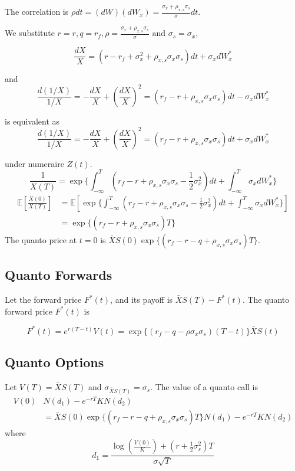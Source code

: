 \documentclass[a4]{article}
\begin{document}
The correlation is $\rho dt=(dW)(dW_{x})=\frac{\sigma_{x}+\rho_{x,s}\sigma_{s}}{\sigma}dt$.\par\bigbreak
\noindent We substitute $r=r,q=r_{f},\rho=\frac{\sigma_{x}+\rho_{x,s}\sigma_{s}}{\sigma}\text{ and } \sigma_{s}=\sigma_{x}$,\par 
$$
\frac{dX}{X}=(r-r_{f}+\sigma_{x}^{2}+\rho_{x,s}\sigma_{x}\sigma_{s})dt + \sigma_{x}dW_{x}^{*}
$$\par 
and $$
\frac{d(1/X)}{1/X}=-\frac{dX}{X} + (\frac{dX}{X})^{2}=(r_{f}-r + \rho_{x,s}\sigma_{x}\sigma_{s})dt-\sigma_{x}dW_{x}^{*}
$$\par 
is equivalent as 
$$
\frac{d(1/X)}{1/X}=-\frac{dX}{X} + (\frac{dX}{X})^{2}=(r_{f}-r + \rho_{x,s}\sigma_{x}\sigma_{s})dt+\sigma_{x}dW_{x}^{*}
$$\par
under numeraire $Z(t)$.
$$
\frac{1}{X(T)}=\exp\{\int_{-\infty}^{T}(r_{f}-r + \rho_{x,s}\sigma_{x}\sigma_{s}-\frac{1}{2}\sigma_{x}^{2})dt+\int_{-\infty}^{T}\sigma_{x}dW_{x}^{*}\}
$$
$$
\begin{aligned}
\mathbb{E}\left[\frac{X(0)}{X(T)}\right]&=\mathbb{E}\left[\exp\{\int_{-\infty}^{T}(r_{f}-r + \rho_{x,s}\sigma_{x}\sigma_{s}-\frac{1}{2}\sigma_{x}^{2})dt+\int_{-\infty}^{T}\sigma_{x}dW_{x}^{*}\}\right]\\
&=\exp\{(r_{f}-r + \rho_{x,s}\sigma_{x}\sigma_{s})T\}
\end{aligned}
$$
The quanto price at $t=0$ is $\bar{X}S(0)\exp\{(r_{f}-r-q + \rho_{x,s}\sigma_{x}\sigma_{s})T\}$.
\subsection{Quanto Forwards}
Let the forward price $F^{*}(t)$, and its payoff is $\bar{X}S(T)-F^{*}(t)$. The quanto forward price $F^{*}(t)$ is\par 
$$
F^{*}(t)=e^{r(T-t)}V(t)=\exp\{(r_{f}-q-\rho\sigma_{x}\sigma_{s})(T-t)\}\bar{X}S(t)
$$
\subsection{Quanto Options}
Let $V(T)=\bar{X}S(T)$ and $\sigma_{\bar{X}S(T)}=\sigma_{s}$. The value of a quanto call is 
$$
\begin{aligned}
V(0)&N(d_{1}) - e^{-rT}KN(d_{2})\\
&=\bar{X}S(0)\exp\{(r_{f}-r-q + \rho_{x,s}\sigma_{x}\sigma_{s})T\}N(d_{1})-e^{-rT}KN(d_{2})
\end{aligned}
$$
where
$$
d_{1}=\frac{\log \left(\frac{V(0)}{K}\right)+(r+\frac{1}{2}\sigma_{s}^{2})T}{\sigma\sqrt{T}}
$$
\end{document}
